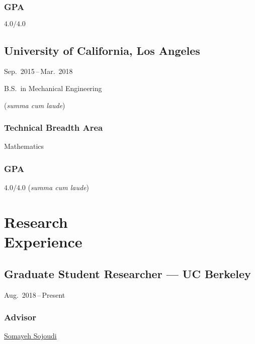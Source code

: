 \documentclass[11pt]{article}
\newcommand{\sectionwidth}{1in}		%
\newcommand{\subsectionskip}{\baselineskip}	%
\newcommand{\cvdates}[2]{\hfill#1\,--\,#2}	%
\begin{document}
	\begin{gpa-on}
		\subsubsection{GPA}
		$4.0/4.0$
	\end{gpa-on}
	
	\vspace*{\subsectionskip}
	
	\subsection{University of California, Los Angeles}
	\cvdates{Sep.\ 2015}{Mar.\ 2018}
	
	\hspace*{\sectionwidth}B.S.\ in Mechanical Engineering
	\begin{gpa-off}
		(\textit{summa cum laude})
	\end{gpa-off}
	
	\subsubsection{Technical Breadth Area}
	Mathematics
	
	\begin{gpa-on}
		\subsubsection{GPA}
		$4.0/4.0$ (\textit{summa cum laude})
	\end{gpa-on}
	
	\section{\texorpdfstring{Research \\[\baselineskip] Experience}{Research Experience}}
	\hfill\vspace*{-2\baselineskip}

	\subsection{Graduate Student Researcher --- UC Berkeley}
	\cvdates{Aug.\ 2018}{Present}
	
	\subsubsection{Advisor}
	\href{https://people.eecs.berkeley.edu/~sojoudi/}{Somayeh Sojoudi}
	
\end{document}

